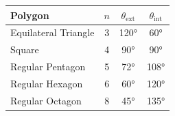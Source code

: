 \begin{center}
\begin{tabular}{lccc}
\textbf{Polygon} & $n$ & $\theta_{\text{ext}}$ & $\theta_{\text{int}}$ \\
\hline
Equilateral Triangle & 3 & 120° & 60° \\
Square & 4 & 90° & 90° \\
Regular Pentagon & 5 & 72° & 108° \\
Regular Hexagon & 6 & 60° & 120° \\
Regular Octagon & 8 & 45° & 135° \\
\end{tabular}
\end{center}
